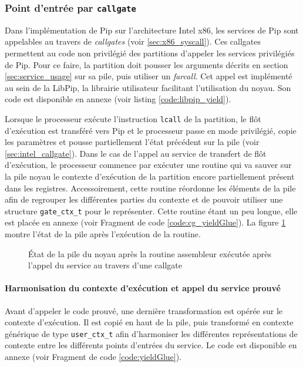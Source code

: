 			\subsubsection{Point d'entrée par \texttt{callgate}}

		Dans l'implémentation de Pip sur l'architecture Intel x86, les services de Pip sont appelables au travers de \emph{callgates} (voir \ref{sec:x86_syscall}). Ces callgates permettent au code non privilégié des partitions d'appeler les services privilégiés de Pip.
		Pour ce faire, la partition doit pousser les arguments décrits en section \ref{sec:service_usage} sur sa pile, puis utiliser un \emph{farcall}. Cet appel est implémenté au sein de la LibPip, la librairie utilisateur facilitant l'utilisation du noyau. Son code est disponible en annexe (voir listing \ref{code:libpip_yield}).

		Lorsque le processeur exécute l'instruction \texttt{lcall} de la partition, le flôt d'exécution est transféré vers Pip et le processeur passe en mode privilégié, copie les paramètres et pousse partiellement l'état précédent sur la pile (voir \ref{sec:intel_callgate}). Dans le cas de l'appel au service de transfert de flôt d'exécution, le processeur commence par exécuter une routine qui va sauver sur la pile noyau le contexte d'exécution de la partition encore partiellement présent dans les registres. Accessoirement, cette routine réordonne les éléments de la pile afin de regrouper les différentes parties du contexte et de pouvoir utiliser une structure \texttt{gate\_ctx\_t} pour le représenter. Cette routine étant un peu longue, elle est placée en annexe (voir Fragment de code \ref{code:cg_yieldGlue}).
		La figure \ref{fig:cg_stack} montre l'état de la pile après l'exécution de la routine.

		\begin{figure}[!ht]
			
			\caption{État de la pile du noyau après la routine assembleur exécutée après l'appel du service au travers d'une callgate}
			\label{fig:cg_stack}
		\end{figure}
	
		\paragraph{Harmonisation du contexte d'exécution et appel du service prouvé} \label{sec:context_harmonisation} Avant d'appeler le code prouvé, une dernière transformation est opérée sur le contexte d'exécution. Il est copié en haut de la pile, puis transformé en contexte générique de type \texttt{user\_ctx\_t} afin d'harmoniser les différentes représentations de contexte entre les différents points d'entrées du service. Le code est disponible en annexe (voir Fragment de code \ref{code:yieldGlue}).

